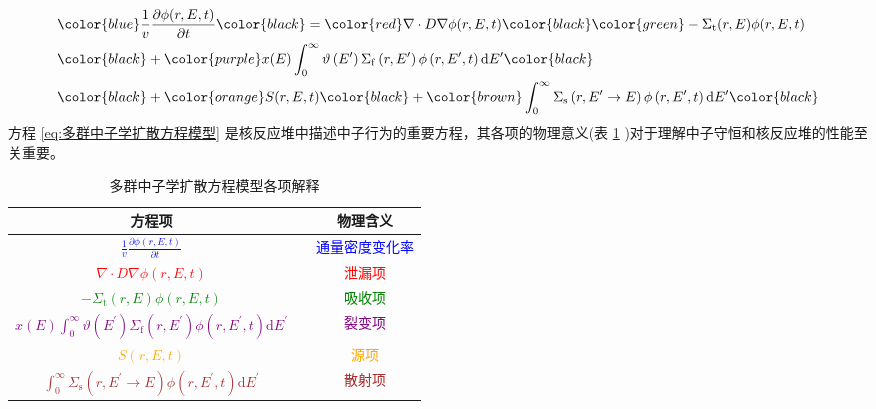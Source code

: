 \documentclass{Sichuan Normal University}
\begin{document}
\begin{equation}
    \begin{aligned}
    & \color{blue}\frac{1}{v} \frac{\partial \phi(r, E, t)}{\partial t} \color{black}= \color{red}\nabla \cdot D \nabla \phi(r, E, t) \color{black} \color{green}- \Sigma_{\mathrm{t}}(r, E) \phi(r, E, t)\\
    & \color{black}+ \color{purple}x(E) \int_0^{\infty} \vartheta\left(E^{\prime}\right) \Sigma_{\mathrm{f}}\left(r, E^{\prime}\right) \phi\left(r, E^{\prime}, t\right) \mathrm{d} E^{\prime} \color{black} \\
    & \color{black}+\color{orange} S(r, E, t) \color{black}+ \color{brown}\int_0^{\infty} \Sigma_{\mathrm{s}}\left(r, E^{\prime} \rightarrow E\right) \phi\left(r, E^{\prime}, t\right) \mathrm{d} E^{\prime} \color{black}
    \end{aligned}
    \label{eq:多群中子学扩散方程模型}
    \end{equation}
方程 \eqref{eq:多群中子学扩散方程模型} 是核反应堆中描述中子行为的重要方程，其各项的物理意义(表 \ref{tab:terms_explanation} )对于理解中子守恒和核反应堆的性能至关重要。
\begin{table}[H]
    \centering
    \begin{tabular}{ccc}
    \toprule
    \textbf{方程项} && \textbf{物理含义} \\    
    \midrule
    \textcolor{blue}{\(\frac{1}{v} \frac{\partial \phi(r, E, t)}{\partial t}\)} && \textcolor{blue}{通量密度变化率} \\
    \textcolor{red}{\(\nabla \cdot D \nabla \phi(r, E, t)\)} &&  \textcolor{red}{泄漏项} \\
    \textcolor{green}{\(- \Sigma_{\mathrm{t}}(r, E) \phi(r, E, t)\)} &&  \textcolor{green}{吸收项} \\
    \textcolor{purple}{\(x(E) \int_0^{\infty} \vartheta\left(E^{\prime}\right) \Sigma_{\mathrm{f}}\left(r, E^{\prime}\right) \phi\left(r, E^{\prime}, t\right) \mathrm{d} E^{\prime}\)} && \textcolor{purple}{裂变项} \\
    \textcolor{orange}{\(S(r, E, t)\)} && \textcolor{orange}{源项} \\
    \textcolor{brown}{\(\int_0^{\infty} \Sigma_{\mathrm{s}}\left(r, E^{\prime} \rightarrow E\right) \phi\left(r, E^{\prime}, t\right) \mathrm{d} E^{\prime}\)} && \textcolor{brown}{散射项} \\
    \bottomrule
    \end{tabular}
    \caption{多群中子学扩散方程模型各项解释}
    \label{tab:terms_explanation}
    \end{table}
\end{document}
